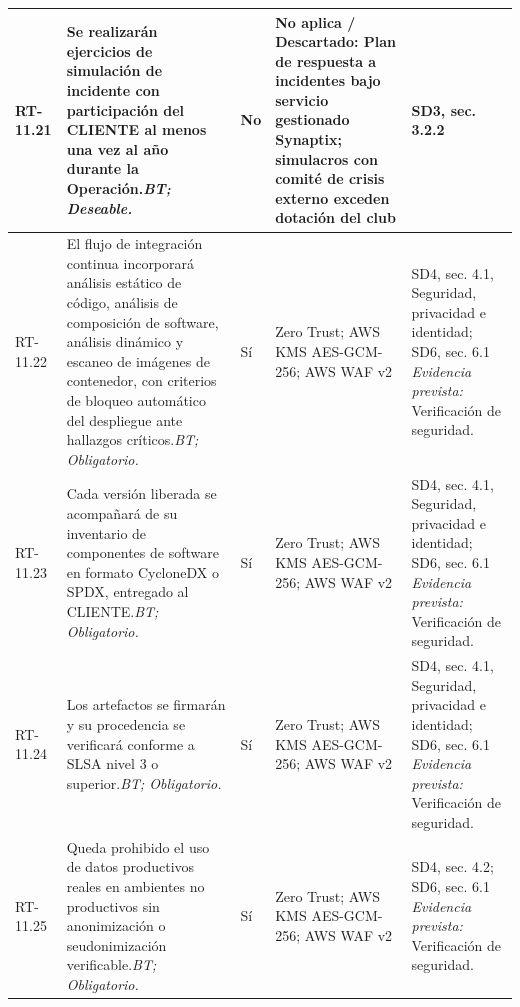 \begin{paginaHorizontalSynaptix}
\begin{longtable}{|L{0.09\AnchoMatrizTDoce}|L{0.385\AnchoMatrizTDoce}|L{0.065\AnchoMatrizTDoce}|L{0.18\AnchoMatrizTDoce}|L{0.28\AnchoMatrizTDoce}|}
RT-\allowbreak{}11.\allowbreak{}21 &
Se realizarán ejercicios de simulación de incidente con participación del CLIENTE al menos una vez al año durante la Operación.\newline\textit{BT; Deseable.} &
No &
No aplica / Descartado: Plan de respuesta a incidentes bajo servicio gestionado Synaptix; simulacros con comité de crisis externo exceden dotación del club &
SD3, sec. 3.2.2 \\ \hline

RT-\allowbreak{}11.\allowbreak{}22 &
El flujo de integración continua incorporará análisis estático de código, análisis de composición de software, análisis dinámico y escaneo de imágenes de contenedor, con criterios de bloqueo automático del despliegue ante hallazgos críticos.\newline\textit{BT; Obligatorio.} &
Sí &
Zero Trust; AWS KMS AES-GCM-256; AWS WAF v2 &
SD4, sec. 4.1, Seguridad, privacidad e identidad; SD6, sec. 6.1 \newline\textit{Evidencia prevista:} Verificación de seguridad. \\ \hline

RT-\allowbreak{}11.\allowbreak{}23 &
Cada versión liberada se acompañará de su inventario de componentes de software en formato CycloneDX o SPDX, entregado al CLIENTE.\newline\textit{BT; Obligatorio.} &
Sí &
Zero Trust; AWS KMS AES-GCM-256; AWS WAF v2 &
SD4, sec. 4.1, Seguridad, privacidad e identidad; SD6, sec. 6.1 \newline\textit{Evidencia prevista:} Verificación de seguridad. \\ \hline

RT-\allowbreak{}11.\allowbreak{}24 &
Los artefactos se firmarán y su procedencia se verificará conforme a SLSA nivel 3 o superior.\newline\textit{BT; Obligatorio.} &
Sí &
Zero Trust; AWS KMS AES-GCM-256; AWS WAF v2 &
SD4, sec. 4.1, Seguridad, privacidad e identidad; SD6, sec. 6.1 \newline\textit{Evidencia prevista:} Verificación de seguridad. \\ \hline

RT-\allowbreak{}11.\allowbreak{}25 &
Queda prohibido el uso de datos productivos reales en ambientes no productivos sin anonimización o seudonimización verificable.\newline\textit{BT; Obligatorio.} &
Sí &
Zero Trust; AWS KMS AES-GCM-256; AWS WAF v2 &
SD4, sec. 4.2; SD6, sec. 6.1 \newline\textit{Evidencia prevista:} Verificación de seguridad. \\ \hline


\end{longtable}
\end{paginaHorizontalSynaptix}
